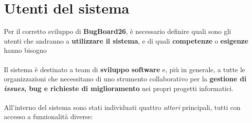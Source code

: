 \chapter{Utenti del sistema}

Per il corretto sviluppo di \textbf{BugBoard26}, è necessario definire quali sono gli utenti che andranno a \textbf{utilizzare il sistema}, e di quali \textbf{competenze} o\textbf{ esigenze} hanno bisogno
\\\\
Il sistema è destinato a team di \textbf{sviluppo software} e, più in generale, a tutte le organizzazioni che necessitano di uno strumento collaborativo per la \textbf{gestione di \textit{issues}, bug e richieste di miglioramento} nei propri progetti informatici.
\\\\
All'interno del sistema sono stati individuati quattro \textit{attori} principali, tutti con accesso a funzionalità diverse:
